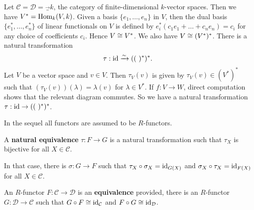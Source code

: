 \begin{example}
Let $\mathcal{C} = \mathcal{D} = \Vec_k$, the category of finite-dimensional $k$-vector spaces. Then we have $V^* = \operatorname{Hom}_k(V,k)$. Given a basis $\{e_1,\dots, e_n\}$ in $V$, then the dual basis $\{e_1^*,\dots,e_n^*\}$ of linear functionals on $V$ is defined by $e_i^*(c_1 {e}_{1}+\dots +c_{n}{e}_{n})=c_{i}$ for any choice of coefficients $c_i$. Hence $V \cong V^*$. We also have $V \cong (V^*)^*$.
There is a natural transformation
\[
\tau : \operatorname{id} \xrightarrow{\sim} (( \ )^*)^*.
\]
Let $V$ be a vector space
and $v\in V$. Then $\tau_V(v)$ is given by $\tau_V(v) \in (V^*)^*$ such that $(\tau_V(v))(\lambda) = \lambda(v)$ for $\lambda\in V^*$. If $f: V \to W$, direct computation shows that the relevant diagram commutes. So we have a
natural transformation $\tau: \id \to (( \ )^*)^*$.
\end{example}


In the sequel all functors are assumed to be $R$-functors.


\begin{definition}
A \textbf{natural equivalence} $\tau: F \to G$ is a natural transformation such that
$\tau_X$ is bijective for all $X \in \mathcal{C}$.
\end{definition}


\begin{remark}
In that case, there is $\sigma: G \to F$ such that $\tau_X \circ \sigma_X = \operatorname{id}_{G(X)}$ and $\sigma_X \circ \tau_X =
\operatorname{id}_{F(X)}$ for all $X \in \mathcal{C}$.
\end{remark}


\begin{definition}
An $R$-functor $F: \mathcal{C} \to \mathcal{D}$ is an \textbf{equivalence} provided, there is an
$R$-functor $G: \mathcal{D} \to \mathcal{C}$ such that $G \circ F \cong \operatorname{id}_\mathcal{C}$ and $F \circ G \cong \operatorname{id}_\mathcal{D}$.
\end{definition}

